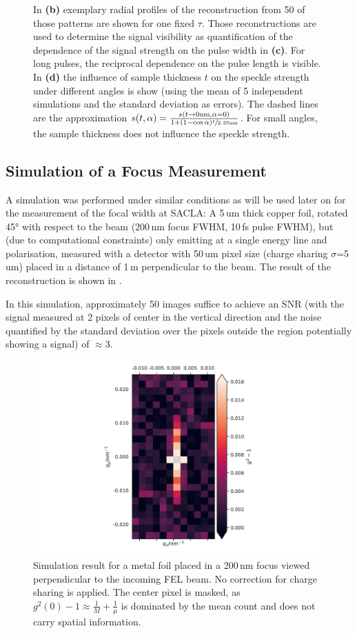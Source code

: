 \begin{figure}
{	In \textbf{(b)} exemplary radial profiles of the reconstruction from 50 of those patterns are shown for one fixed $\tau$. Those reconstructions are used to determine the signal visibility as quantification of the  dependence of the signal strength on the pulse width in \textbf{(c)}. For long pulses, the reciprocal dependence on the pulse length is visible.
	In \textbf{(d)}  the influence of sample thickness $t$ on the speckle strength under different angles is show (using the mean of 5 independent simulations and the standard deviation as errors). The dashed lines are the approximation $s(t,\alpha)=\frac{s(t\rightarrow0\text{um}, \alpha= 0)}{1+\left(1-\cos{\alpha}\right)\sfrac{t}{2.35\text{um}}}$. For small angles, the sample thickness does not influence the speckle strength.}
\end{figure}
\clearpage
\subsection{Simulation of a Focus Measurement}
A simulation was performed under similar conditions as will be used later on for the measurement of the focal width at SACLA:  A 5\,um thick copper foil, rotated 45° with respect to the beam (200\,nm focus FWHM, 10\,fs pulse FWHM), but (due to computational constraints) only emitting at a single energy line and polarisation, measured with a detector with 50\,um pixel size (charge sharing $\sigma$=5\,um) placed in a distance of 1\,m perpendicular to the beam. The result of the reconstruction is shown in . 

In this simulation, approximately 50 images suffice to achieve an SNR (with the signal measured at 2 pixels of center in the vertical direction and the noise quantified by the standard deviation over the pixels outside the region potentially showing a signal) of $\approx$3.

\begin{figure}
	\centering
	\includegraphics[width=0.5\linewidth]{images/sim_foil5umCu_shared.pdf}
	\caption[Simulation of a metal foil with similar parameters as used in the experiment]{Simulation result for a metal foil placed in a 200\,nm focus viewed perpendicular to the incoming FEL beam. No correction for charge sharing is applied. The center pixel is masked, as $g^2(0)-1\approx 
		\frac{1}{M}+\frac{1}{\mu}$ is dominated by the mean count and does 
		not carry spatial information.}
	\label{fig:simfoil}
\end{figure}

